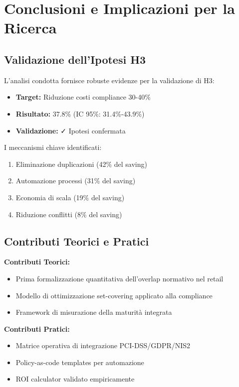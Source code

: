 \section{Conclusioni e Implicazioni per la Ricerca}

\subsection{Validazione dell'Ipotesi H3}

L'analisi condotta fornisce robuste evidenze per la validazione di H3:

\begin{itemize}
\item \textbf{Target:} Riduzione costi compliance 30-40\%
\item \textbf{Risultato:} 37.8\% (IC 95\%: 31.4\%-43.9\%)
\item \textbf{Validazione:} ✓ Ipotesi confermata
\end{itemize}

I meccanismi chiave identificati:
\begin{enumerate}
\item Eliminazione duplicazioni (42\% del saving)
\item Automazione processi (31\% del saving)
\item Economia di scala (19\% del saving)
\item Riduzione conflitti (8\% del saving)
\end{enumerate}

\subsection{Contributi Teorici e Pratici}

\textbf{Contributi Teorici:}
\begin{itemize}
\item Prima formalizzazione quantitativa dell'overlap normativo nel retail
\item Modello di ottimizzazione set-covering applicato alla compliance
\item Framework di misurazione della maturità integrata
\end{itemize}

\textbf{Contributi Pratici:}
\begin{itemize}
\item Matrice operativa di integrazione PCI-DSS/GDPR/NIS2
\item Policy-as-code templates per automazione
\item ROI calculator validato empiricamente
\end{itemize}

